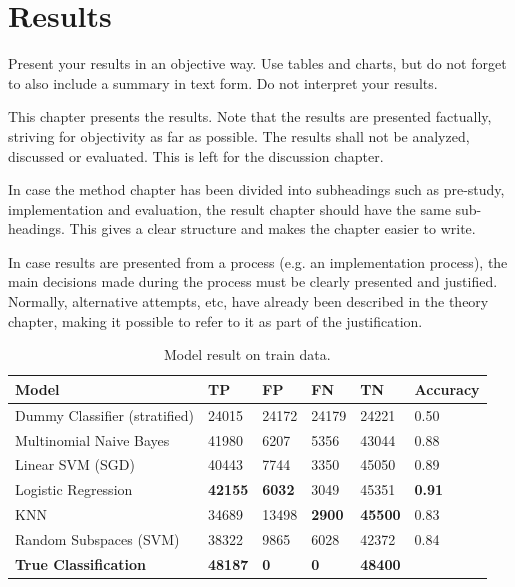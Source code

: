 \chapter{Results}
\label{cha:results}

Present your results in an objective way. Use tables and charts, but do not
forget to also include a summary in text form. Do not interpret your results.

This chapter presents the results. Note that the results are presented
factually, striving for objectivity as far as possible.  The results
shall not be analyzed, discussed or evaluated.  This is left for the
discussion chapter.

In case the method chapter has been divided into subheadings such as
pre-study, implementation and evaluation, the result chapter should
have the same sub-headings. This gives a clear structure and makes the
chapter easier to write.

In case results are presented from a process (e.g. an implementation
process), the main decisions made during the process must be clearly
presented and justified. Normally, alternative attempts, etc, have
already been described in the theory chapter, making it possible to
refer to it as part of the justification.


\begin{table}[]
    \centering
    \caption{Model result on train data.}
    \label{tab:train-table}
    \begin{tabular}{@{}llllll@{}}
    \toprule
    Model                         & TP             & FP            & FN            & TN             & Accuracy      \\ \midrule
    Dummy Classifier (stratified) & 24015          & 24172         & 24179         & 24221          & 0.50          \\
    Multinomial Naive Bayes       & 41980          & 6207          & 5356          & 43044          & 0.88          \\
    Linear SVM (SGD)              & 40443          & 7744          & 3350          & 45050          & 0.89          \\
    Logistic Regression           & \textbf{42155} & \textbf{6032} & 3049          & 45351          & \textbf{0.91} \\
    KNN                           & 34689          & 13498         & \textbf{2900} & \textbf{45500} & 0.83          \\
    Random Subspaces (SVM)        & 38322          & 9865          & 6028          & 42372          & 0.84          \\ \midrule
    \textbf{True Classification}  & \textbf{48187} & \textbf{0}    & \textbf{0}    & \textbf{48400} & \textbf{}    
    \end{tabular}
\end{table}


